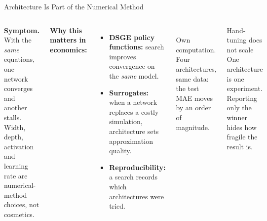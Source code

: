 \documentclass[aspectratio=169,11pt]{beamer}
\newcommand{\emphc}[1]{\textcolor{harvardcrimson}{#1}}
\begin{document}
\begin{frame}{Architecture Is Part of the Numerical Method}
\begin{columns}[T,onlytextwidth]
\textbf{\color{uzhblue}Symptom.} With the \emph{same} equations, one network converges and another stalls. Width, depth, activation and learning rate are \emphc{numerical-method choices}, not cosmetics.

\vspace{0.4em}
\textbf{\color{uzhblue}Why this matters in economics:}
\begin{itemize}\setlength\itemsep{3pt}\footnotesize
  \item \textbf{DSGE policy functions:} search improves convergence on the \emph{same} model.
  \item \textbf{Surrogates:} when a network replaces a costly simulation, architecture sets approximation quality.
  \item \textbf{Reproducibility:} a search records which architectures were tried.
\end{itemize}

\begin{center}
\\
{\footnotesize Own computation. Four architectures, same data: the test MAE moves by an order of magnitude.}
\end{center}

\begin{alertblock}{Hand-tuning does not scale}
\footnotesize
One architecture is one experiment. Reporting only the winner hides how fragile the result is.
\end{alertblock}
\end{columns}
\end{frame}
\end{document}
